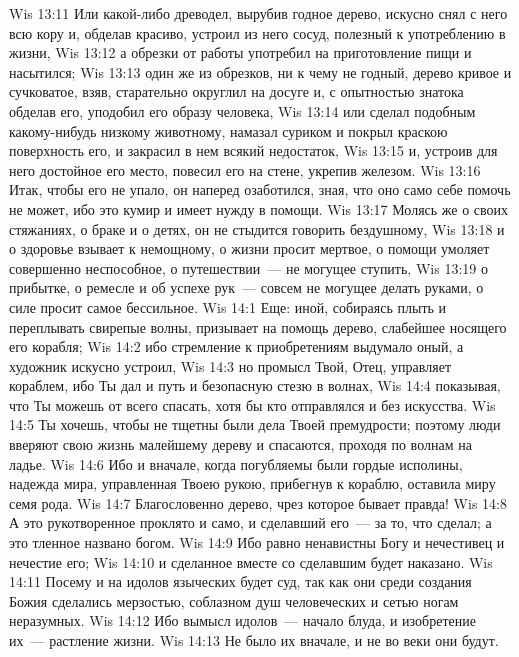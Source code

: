 \vs Wis 13:11 Или какой-либо древодел, вырубив годное дерево, искусно снял с него всю кору и, обделав красиво, устроил из него сосуд, полезный к употреблению в жизни,
\vs Wis 13:12 а обрезки от работы употребил на приготовление пищи и насытился;
\vs Wis 13:13 один же из обрезков, ни к чему не годный, дерево кривое и сучковатое, взяв, старательно округлил на досуге и, с опытностью знатока обделав его, уподобил его образу человека,
\vs Wis 13:14 или сделал подобным какому-нибудь низкому животному, намазал суриком и покрыл краскою поверхность его, и закрасил в нем всякий недостаток,
\vs Wis 13:15 и, устроив для него достойное его место, повесил его на стене, укрепив железом.
\vs Wis 13:16 Итак, чтобы  его не упало, он наперед озаботился, зная, что оно само себе помочь не может, ибо это кумир и имеет нужду в помощи.
\vs Wis 13:17 Молясь же  о своих стяжаниях, о браке и о детях, он не стыдится говорить бездушному,
\vs Wis 13:18 и о здоровье взывает к немощному, о жизни просит мертвое, о помощи умоляет совершенно неспособное, о путешествии~--- не могущее ступить,
\vs Wis 13:19 о прибытке, о ремесле и об успехе рук~--- совсем не могущее делать руками, о силе просит самое бессильное.
\vs Wis 14:1 Еще: иной, собираясь плыть и переплывать свирепые волны, призывает на помощь дерево, слабейшее носящего его корабля;
\vs Wis 14:2 ибо стремление к приобретениям выдумало оный, а художник искусно устроил,
\vs Wis 14:3 но промысл Твой, Отец, управляет кораблем, ибо Ты дал и путь  и безопасную стезю в волнах,
\vs Wis 14:4 показывая, что Ты можешь от всего спасать, хотя бы кто отправлялся  и без искусства.
\vs Wis 14:5 Ты хочешь, чтобы не тщетны были дела Твоей премудрости; поэтому люди вверяют свою жизнь малейшему дереву и спасаются, проходя по волнам на ладье.
\vs Wis 14:6 Ибо и вначале, когда погубляемы были гордые исполины, надежда мира, управленная Твоею рукою, прибегнув к кораблю, оставила миру семя рода.
\vs Wis 14:7 Благословенно дерево, чрез которое бывает правда!
\vs Wis 14:8 А это рукотворенное проклято и само, и сделавший его~--- за то, что сделал; а это тленное названо богом.
\vs Wis 14:9 Ибо равно ненавистны Богу и нечестивец и нечестие его;
\vs Wis 14:10 и сделанное вместе со сделавшим будет наказано.
\vs Wis 14:11 Посему и на идолов языческих будет суд, так как они среди создания Божия сделались мерзостью, соблазном душ человеческих и сетью ногам неразумных.
\vs Wis 14:12 Ибо вымысл идолов~--- начало блуда, и изобретение их~--- растление жизни.
\vs Wis 14:13 Не было их вначале, и не во веки они будут.
